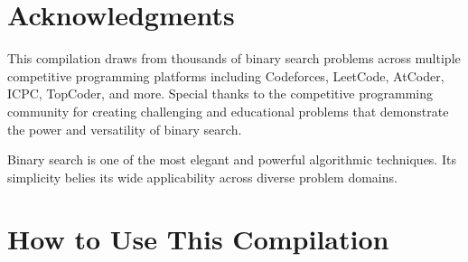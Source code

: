\documentclass[11pt,a4paper,oneside]{book}
\begin{document}
\vspace{2cm}


\chapter*{Acknowledgments}

\begin{tcolorbox}[
    enhanced,
    colback=lightgray,
    colframe=successgreen,
    boxrule=2pt,
    arc=4mm
]
This compilation draws from thousands of binary search problems across multiple competitive programming platforms including Codeforces, LeetCode, AtCoder, ICPC, TopCoder, and more. Special thanks to the competitive programming community for creating challenging and educational problems that demonstrate the power and versatility of binary search.

Binary search is one of the most elegant and powerful algorithmic techniques. Its simplicity belies its wide applicability across diverse problem domains.
\end{tcolorbox}

\vspace{1cm}


\chapter*{How to Use This Compilation}
\end{document}

